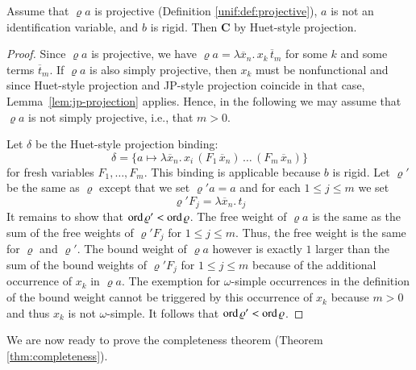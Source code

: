     \begin{lemma}
    \label{lem:huet-projection}
    Assume that $\varrho a$ is
    projective (Definition \ref{unif:def:projective}),
    $a$ is not an identification variable, and $b$ is rigid.
    Then \textbf{C} by Huet-style projection.
    \end{lemma}
    \begin{proof}
    Since $\varrho a$ is
    projective, we have $\varrho a = \lambda \overline{x}_n.\, x_k\,\overline{t}_m$
    for some $k$ and some terms $\overline{t}_m$.
    If $\varrho a$ is also simply projective,
    then $x_k$ must be nonfunctional
    and since Huet-style projection and JP-style projection coincide
    in that case, Lemma~\ref{lem:jp-projection} applies.
    Hence, in the following we may assume that $\varrho a$ is not simply projective,
    i.e., that $m>0$.
    
    Let $\delta$ be
    the Huet-style projection binding:
    \[ \delta = \{a \mapsto \lambda \overline{x}_n. \, x_i \, (F_1 \, \overline{x}_n) \, \ldots \, (F_m \, \overline{x}_n)\} \]
    for fresh variables $F_1,\dots,F_m$.
    This binding is applicable because $b$ is rigid.
    Let $\varrho'$ be the same as $\varrho$ except that we set $\varrho' a = a$
    and for each $1\leq j\leq m$ we set
    \[
      \varrho' F_j = \lambda \overline{x}_n. \, t_j
    \]
    It remains to show that $\operatorname{ord}\varrho'<\operatorname{ord}\varrho$.
    The free weight of $\varrho a$ is the same as 
    the sum of the free weights of $\varrho' F_j$ for $1\leq j\leq m$.
    Thus, the free weight is the same for $\varrho$ and $\varrho'$.
    The bound weight of $\varrho a$ however is exactly $1$ larger than
    the sum of the bound weights of $\varrho' F_j$ for $1\leq j\leq m$
    because of the additional occurrence of $x_k$ in $\varrho a$.
    The exemption for $\omega$-simple occurrences in the definition
    of the bound weight cannot be triggered by this occurrence of $x_k$
    because $m > 0$ and thus $x_k$ is not $\omega$-simple.
    It follows that $\operatorname{ord}\varrho'<\operatorname{ord}\varrho$.
    \end{proof}
    We are now ready to prove the completeness theorem (Theorem \ref{thm:completeness}).
